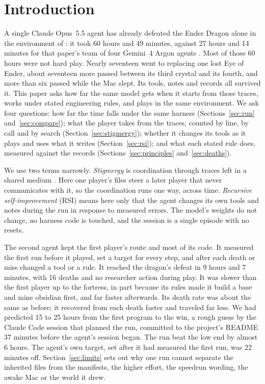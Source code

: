 \documentclass[11pt,a4paper]{article}
\begin{document}
\clearpage
\section{Introduction}

A single Claude Opus~5.5 agent has already defeated the Ender Dragon alone in the environment of \citet{faldor2026team}: it took 60 hours and 49 minutes, against 27 hours and 14 minutes for that paper's team of four Gemini~4 Argon agents \citep{batsuk2026single}. Most of those 60 hours were not hard play. Nearly seventeen went to replacing one lost Eye of Ender, about seventeen more passed between its third crystal and its fourth, and more than six passed while the Mac slept. Its tools, notes and records all survived it. This paper asks how far the same model gets when it starts from those traces, works under stated engineering rules, and plays in the same environment. We ask four questions: how far the time falls under the same harness (Sections~\ref{sec:run} and~\ref{sec:compare}); what the player takes from the traces, counted by line, by call and by search (Section~\ref{sec:stigmergy}); whether it changes its tools as it plays and uses what it writes (Section~\ref{sec:rsi}); and what each stated rule does, measured against the records (Sections~\ref{sec:principles} and~\ref{sec:deaths}).

We use two terms narrowly. \emph{Stigmergy} is coordination through traces left in a shared medium \citep{grasse1959,theraulaz1999,heylighen2016}. Here one player's files steer a later player that never communicates with it, so the coordination runs one way, across time. \emph{Recursive self-improvement} (RSI) means here only that the agent changes its own tools and notes during the run in response to measured errors. The model's weights do not change, no harness code is touched, and the session is a single episode with no resets.

The second agent kept the first player's route and most of its code. It measured the first run before it played, set a target for every step, and after each death or miss changed a tool or a rule. It reached the dragon's defeat in 9 hours and 7 minutes, with 16 deaths and no researcher action during play. It was slower than the first player up to the fortress, in part because its rules made it build a base and mine obsidian first, and far faster afterwards. Its death rate was about the same as before; it recovered from each death faster and traveled far less. We had predicted 15 to 25 hours from the first program to the win, a rough guess by the Claude Code session that planned the run, committed to the project's README 37 minutes before the agent's session began. The run beat the low end by almost 6 hours. The agent's own target, set after it had measured the first run, was 22 minutes off. Section~\ref{sec:limits} sets out why one run cannot separate the inherited files from the manifests, the higher effort, the speedrun wording, the awake Mac or the world it drew.
\end{document}
